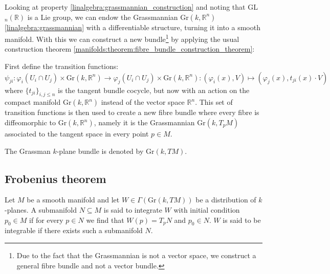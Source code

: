 	Looking at property \ref{linalgebra:grassmannian_construction} and noting that GL$_n(\mathbb{R})$ is a Lie group, we can endow the Grassmannian Gr$(k, \mathbb{R}^n)$ \ref{linalgebra:grassmannian} with a differentiable structure, turning it into a smooth manifold. With this we can construct a new bundle\footnote{Due to the fact that the Grassmannian is not a vector space, we construct a general fibre bundle and not a vector bundle.} by applying the usual construction theorem \ref{manifolds:theorem:fibre_bundle_construction_theorem}:
	
	\begin{construct}
		First define the transition functions:
		\begin{equation}
			\psi_{ji}:\varphi_i(U_i\cap U_j)\times \text{Gr}(k, \mathbb{R}^n) \rightarrow \varphi_j(U_i\cap U_j)\times \text{Gr}(k, \mathbb{R}^n):(\varphi_i(x), V)\mapsto(\varphi_j(x), t_{ji}(x)\cdot V)
		\end{equation}
		where $\{t_{ji}\}_{i, j\leq n}$ is the tangent bundle cocycle, but now with an action on the compact manifold Gr$(k, \mathbb{R}^n)$ instead of the vector space $\mathbb{R}^n$. This set of transition functions is then used to create a new fibre bundle where every fibre is diffeomorphic to Gr$(k, \mathbb{R}^n)$, namely it is the Grassmannian Gr$(k, T_pM)$ associated to the tangent space in every point $p\in M$.
	\end{construct}
	\begin{notation}
		The Grassman $k$-plane bundle is denoted by Gr$(k, TM)$.
	\end{notation}

\subsection{Frobenius theorem}
	
	
	\begin{definition}[Integrable]
		Let $M$ be a smooth manifold and let $W\in\Gamma(\text{Gr}(k, TM))$ be a distribution of $k$-planes. A submanifold $N\subseteq M$ is said to integrate $W$ with initial condition $p_0\in M$ if for every $p\in N$ we find that $W(p) = T_pN$ and $p_0\in N$. $W$ is said to be integrable if there exists such a submanifold $N$.
	\end{definition}
	
